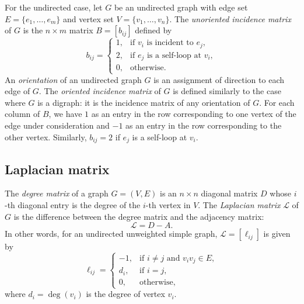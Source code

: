 For the undirected case, let $G$ be an undirected graph with edge set
$E = \{ e_1, \dots, e_m \}$ and vertex set
$V = \{ v_1, \dots, v_n \}$. The \emph{unoriented incidence matrix} of
$G$ is the $n \times m$ matrix $B = [b_{ij}]$ defined by
\[
b_{ij}
=
\begin{cases}
1, & \text{if $v_i$ is incident to $e_j$}, \\
2, & \text{if $e_j$ is a self-loop at $v_i$}, \\
0, & \text{otherwise}.
\end{cases}
\]
An \emph{orientation} of an undirected graph $G$ is an assignment of
direction to each edge of $G$. The \emph{oriented incidence matrix} of
$G$ is defined similarly to the case where $G$ is a digraph: it is the
incidence matrix of any orientation of $G$. For each column of $B$, we
have $1$ as an entry in the row corresponding to one vertex of the
edge under consideration and $-1$ as an entry in the row corresponding
to the other vertex. Similarly, $b_{ij} = 2$ if $e_j$ is a self-loop
at $v_i$.

%



\subsection{Laplacian matrix}

The \emph{degree matrix} of a graph $G = (V,E)$ is an $n \times n$
diagonal matrix $D$ whose $i$-th diagonal entry is the degree of the
$i$-th vertex in $V$. The \emph{Laplacian matrix} $\mathcal{L}$ of $G$
is the difference between the degree matrix and the adjacency matrix:
\[
\mathcal{L} = D - A.
\]
In other words, for an undirected unweighted simple graph,
$\mathcal{L} = [\ell_{ij}]$ is given by
\[
\ell_{ij}
=
\begin{cases}
-1,  & \text{if $i \neq j$ and $v_i v_j \in E$}, \\
d_i, & \text{if $i = j$}, \\
0,   & \text{otherwise},
\end{cases}
\]
where $d_i = \deg(v_i)$ is the degree of vertex $v_i$.

